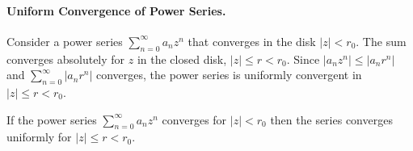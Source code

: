\paragraph{Uniform Convergence of Power Series.}
Consider a power series $\sum_{n = 0}^\infty a_n z^n$ that converges in the 
disk $|z| < r_0$.  The sum converges absolutely for $z$ in the closed disk, 
$|z| \leq r < r_0$. Since $|a_n z^n| \leq |a_n r^n|$ and 
$\sum_{n = 0}^\infty |a_n r^n|$ converges, the power series is uniformly convergent
in $|z| \leq r < r_0$.



\begin{Result}
  If the power series $\sum_{n = 0}^\infty a_n z^n$ converges for $|z| < r_0$ then the
  series converges uniformly for $|z| \leq r < r_0$.
\end{Result}





